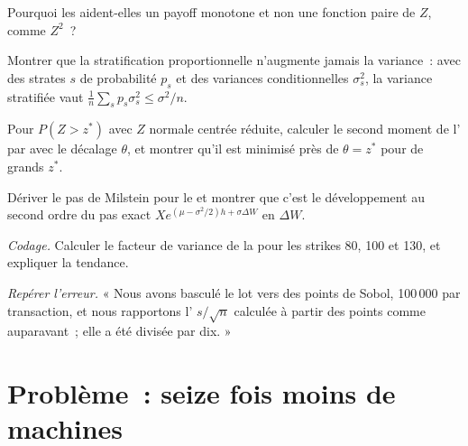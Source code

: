 \begin{exercise}[$\star$]\label{exo:qm:monte-carlo:3}
Pourquoi les  aident-elles un payoff monotone et non une fonction paire de $Z$, comme $Z^2$~?
\end{exercise}

\begin{exercise}[$\star\star$]\label{exo:qm:monte-carlo:4}
Montrer que la stratification proportionnelle n'augmente jamais la variance~: avec des strates $s$ de probabilité $p_s$ et des variances conditionnelles $\sigma_s^2$, la variance stratifiée vaut $\frac1n\sum_sp_s\sigma_s^2 \le
\sigma^2/n$.
\end{exercise}

\begin{exercise}[$\star\star$]\label{exo:qm:monte-carlo:5}
Pour $P(Z > z^*)$ avec $Z$ normale centrée réduite, calculer le second moment de l' par  avec le décalage $\theta$, et montrer qu'il est minimisé près de $\theta = z^*$ pour de grands $z^*$.
\end{exercise}

\begin{exercise}[$\star\star$]\label{exo:qm:monte-carlo:6}
Dériver le pas de Milstein pour le  et montrer que c'est le développement au second ordre du pas exact $X e^{(\mu - \sigma^2/2)h + \sigma\Delta W}$ en $\Delta W$.
\end{exercise}

\begin{exercise}[$\star\star\star$]\label{exo:qm:monte-carlo:7}
\emph{Codage.} Calculer le facteur de variance de la  pour les strikes 80, 100 et 130, et expliquer la tendance.
\end{exercise}

\begin{exercise}[$\star\star\star$]\label{exo:qm:monte-carlo:8}
\emph{Repérer l'erreur.} « Nous avons basculé le lot vers des points de Sobol, 100\,000 par transaction, et nous rapportons l' $s/\sqrt n$ calculée à partir des points comme auparavant~; elle a été divisée par dix. »
\end{exercise}

\section{Problème~: seize fois moins de machines}

